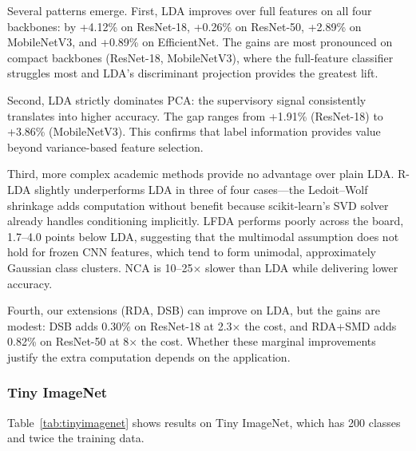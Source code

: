 Several patterns emerge. First, LDA improves over full features on all four backbones: by +4.12\% on ResNet-18, +0.26\% on ResNet-50, +2.89\% on MobileNetV3, and +0.89\% on EfficientNet. The gains are most pronounced on compact backbones (ResNet-18, MobileNetV3), where the full-feature classifier struggles most and LDA's discriminant projection provides the greatest lift.

Second, LDA strictly dominates PCA: the supervisory signal consistently translates into higher accuracy. The gap ranges from +1.91\% (ResNet-18) to +3.86\% (MobileNetV3). This confirms that label information provides value beyond variance-based feature selection.

Third, more complex academic methods provide no advantage over plain LDA. R-LDA slightly underperforms LDA in three of four cases---the Ledoit--Wolf shrinkage adds computation without benefit because scikit-learn's SVD solver already handles conditioning implicitly. LFDA performs poorly across the board, 1.7--4.0 points below LDA, suggesting that the multimodal assumption does not hold for frozen CNN features, which tend to form unimodal, approximately Gaussian class clusters. NCA is 10--25$\times$ slower than LDA while delivering lower accuracy.

Fourth, our extensions (RDA, DSB) can improve on LDA, but the gains are modest: DSB adds 0.30\% on ResNet-18 at 2.3$\times$ the cost, and RDA+SMD adds 0.82\% on ResNet-50 at 8$\times$ the cost. Whether these marginal improvements justify the extra computation depends on the application.

\subsubsection{Tiny ImageNet}

Table~\ref{tab:tinyimagenet} shows results on Tiny ImageNet, which has 200 classes and twice the training data.

